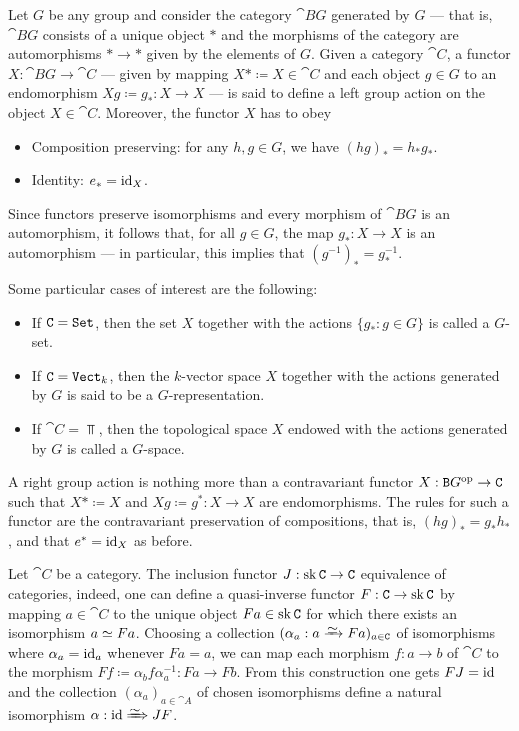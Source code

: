 \begin{example}\label{exp:grp-action}
Let \(G\) be any group and consider the category \(\cat{B}G\) generated by \(G\)
--- that is, \(\cat BG\) consists of a unique object \(*\) and the morphisms of
the category are automorphisms \(* \to *\) given by the elements of \(G\). Given
a category \(\cat C\), a functor \(X: \cat BG \to \cat C\) --- given by mapping
\(X* \coloneq X \in \cat C\) and each object \(g \in G\) to an endomorphism
\(Xg \coloneq g_{*}: X \to X\) --- is said to define a left group action on the
object \(X \in \cat C\). Moreover, the functor \(X\) has to obey
\begin{itemize}\setlength\itemsep{0em}
\item Composition preserving: for any \(h, g \in G\), we have \((h g)_{*} =
  h_{*} g_{*}\).
\item Identity: \(e_{*} = \operatorname{id}_X\).
\end{itemize}
Since functors preserve isomorphisms and every morphism of \(\cat BG\) is an
automorphism, it follows that, for all \(g \in G\), the map \(g_{*}: X \to X\)
is an automorphism --- in particular, this implies that \((g^{-1})_{*} =
g_{*}^{-1}\).

Some particular cases of interest are the following:
\begin{itemize}\setlength\itemsep{0em}
\item If \(\texttt C = {\texttt{Set}}\), then the set \(X\) together with the actions
  \(\{g_{*} \colon g \in G\}\) is called a \(G\)-set.
\item If \(\texttt C = {\texttt{Vect}}_k\), then the \(k\)-vector space \(X\) together with
  the actions generated by \(G\) is said to be a \(G\)-representation.
\item If \(\cat C = \Top\), then the topological space \(X\) endowed with the
  actions generated by \(G\) is called a \(G\)-space.
\end{itemize}

A right group action is nothing more than a contravariant functor \(X: \texttt
BG^{\mathrm{op}} \to \texttt C\) such that \(X* \coloneq X\) and \(Xg \coloneq g^{*}: X \to
X\) are endomorphisms. The rules for such a functor are the contravariant
preservation of compositions, that is, \((h g)_{*} = g_{*} h_{*}\), and that
\(e^{*} = \operatorname{id}_X\) as before.
\end{example}

\begin{example}
\label{exp:skeletal-functor}
Let \(\cat C\) be a category. The inclusion functor \(J: \operatorname{sk} \texttt C \to \texttt C\)
equivalence of categories, indeed, one can define a quasi-inverse functor
\(F: \texttt C \to \operatorname{sk} \texttt C\) by mapping \(a \in \cat C\) to the unique object
\(F a \in \operatorname{sk} \texttt C\) for which there exists an isomorphism \(a \simeq F
a\). Choosing a collection \((\alpha_a: a \isoto F a)_{a \in \cat C}\) of
isomorphisms where \(\alpha_a = \operatorname{id}_a\) whenever \(F a = a\), we can map each
morphism \(f: a \to b\) of \(\cat C\) to the morphism
\(F f \coloneq \alpha_b f \alpha_a^{-1}: F a \to F b\). From this construction
one gets \(F J = \operatorname{id}\) and the collection \((\alpha_a)_{a \in \cat A}\) of
chosen isomorphisms define a natural isomorphism \(\alpha: \Id \isonat J F\).
\end{example}


